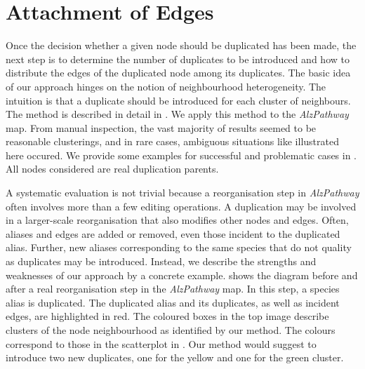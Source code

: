 \documentclass[
	fontsize=10pt, %
	twoside=true, %
	secnumdepth=1, %
  toc=indentunnumbered %
]{kaobook}
\begin{document}


\section{Attachment of Edges}
\label{sec:attachment-of-edges}

Once the decision whether a given node should be duplicated has been made, the
next step is to determine the number of duplicates to be introduced and how to
distribute the edges of the duplicated node among its duplicates. 
%
The basic idea of our approach hinges on the notion of neighbourhood
heterogeneity. The intuition is that a duplicate should be introduced for each
cluster of neighbours. The method is described in detail in
. We apply this method to the \textit{AlzPathway} map.
%
From
manual inspection, the vast majority of results seemed to be reasonable
clusterings, and in rare cases, ambiguous situations like illustrated here
occured. We provide some examples for successful and problematic cases in
. All nodes considered are real duplication
parents.



A systematic evaluation is not trivial because a reorganisation step in
\textit{AlzPathway} often involves more than a few editing operations. A
duplication may be involved in a larger-scale reorganisation that also modifies
other nodes and edges. Often, aliases and edges are added or removed, even those
incident to the duplicated alias. Further, new aliases corresponding to the same
species that do not quality as duplicates may be introduced. Instead, we
describe the strengths and weaknesses of our approach by a concrete example.
 shows the diagram before and after a real
reorganisation step in the \textit{AlzPathway} map. In this step, a species
alias is duplicated. The duplicated alias and its duplicates, as well as
incident edges, are highlighted in red.
% 
The coloured boxes in the top image describe clusters of the node neighbourhood
as identified by our method. The colours correspond to those in the scatterplot in
.
% 
Our method would suggest to introduce two new duplicates, one for the yellow and one
for the green cluster.
% 
\end{document}
